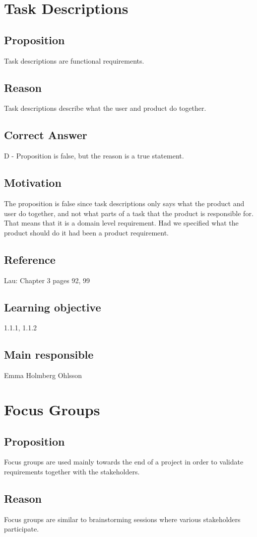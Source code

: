 \documentclass[a4paper]{article}
\begin{document}
\section{Task Descriptions}
\subsection*{Proposition}
Task descriptions are functional requirements.
\subsection*{Reason}
Task descriptions describe what the user and product do together.
\subsection*{Correct Answer}
D - Proposition is false, but the reason is a true statement.
\subsection*{Motivation}
The proposition is false since task descriptions only says what the product and user do together, and not what parts of a task that the product is responsible for. That means that it is a domain level requirement. Had we specified what the product should do it had been a product requirement.
\subsection*{Reference}
Lau: Chapter 3 pages 92, 99
\subsection*{Learning objective}
1.1.1, 1.1.2
\subsection*{Main responsible}
Emma Holmberg Ohlsson


\section{Focus Groups}
\subsection*{Proposition}
Focus groups are used mainly towards the end of a project in order to validate requirements together with the stakeholders.
\subsection*{Reason}
Focus groups are similar to brainstorming sessions where various stakeholders participate.
\end{document}
